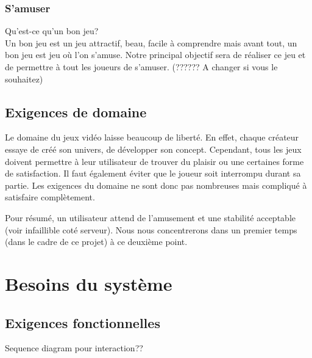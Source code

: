 \documentclass[11pt,a4paper]{article}
\begin{document}
\subsubsection{S'amuser}
Qu'est-ce qu'un bon jeu?\\
Un bon jeu est un jeu attractif, beau, facile à comprendre mais avant tout, un bon jeu est jeu où l'on s'amuse. Notre principal objectif sera de réaliser ce jeu et de permettre à tout les joueurs de s'amuser. (?????? A changer si vous le souhaitez)


\subsection{Exigences de domaine}
\label{sec:exi-dom}

Le domaine du jeux vidéo laisse beaucoup de liberté.  En effet,
chaque créateur essaye de créé son univers, de développer son
concept.  Cependant, tous les jeux doivent permettre à leur
utilisateur de trouver du plaisir ou une certaines forme de
satisfaction.  Il faut également éviter que le joueur soit
interrompu durant sa partie.  Les exigences du domaine ne sont
donc pas nombreuses mais compliqué à satisfaire complètement.


Pour résumé, un utilisateur attend de l'amusement et une stabilité
acceptable (voir infaillible coté serveur).  Nous nous
concentrerons dans un premier temps (dans le cadre de ce projet) à
ce deuxième point.




\section{Besoins du système}
\label{sec:besoins-sys}

\subsection{Exigences fonctionnelles}
\label{sec:exi-fonc-sys}


Sequence diagram pour interaction??
\end{document}

